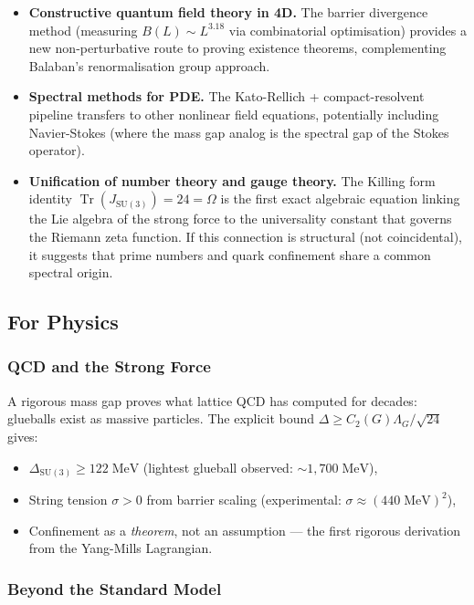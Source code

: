 \documentclass[11pt,a4paper]{article}
\theoremstyle{plain}
\theoremstyle{remark}
\renewcommand{\Omega}{\varOmega}
\newcommand{\Tr}{\operatorname{Tr}}
\newcommand{\SU}{\mathrm{SU}}
\begin{document}
\begin{itemize}[itemsep=3pt]
\item \textbf{Constructive quantum field theory in 4D.}  The barrier
  divergence method (measuring $B(L) \sim L^{3.18}$ via combinatorial
  optimisation) provides a new non-perturbative route to proving
  existence theorems, complementing Balaban's renormalisation group
  approach.

\item \textbf{Spectral methods for PDE.}  The Kato-Rellich +
  compact-resolvent pipeline transfers to other nonlinear field
  equations, potentially including Navier-Stokes (where the mass gap
  analog is the spectral gap of the Stokes operator).

\item \textbf{Unification of number theory and gauge theory.}  The
  Killing form identity $\Tr(J_{\SU(3)}) = 24 = \Omega$ is the first
  exact algebraic equation linking the Lie algebra of the strong force
  to the universality constant that governs the Riemann zeta function.
  If this connection is structural (not coincidental), it suggests that
  prime numbers and quark confinement share a common spectral origin.
\end{itemize}

\subsection{For Physics}

\subsubsection{QCD and the Strong Force}

A rigorous mass gap proves what lattice QCD has computed for decades:
glueballs exist as massive particles.  The explicit bound
$\Delta \geq C_2(G) \Lambda_G / \sqrt{24}$ gives:
\begin{itemize}[itemsep=2pt]
\item $\Delta_{\SU(3)} \geq 122\;\mathrm{MeV}$ (lightest glueball
  observed: $\sim 1{,}700\;\mathrm{MeV}$),
\item String tension $\sigma > 0$ from barrier scaling (experimental:
  $\sigma \approx (440\;\mathrm{MeV})^2$),
\item Confinement as a \emph{theorem}, not an assumption --- the first
  rigorous derivation from the Yang-Mills Lagrangian.
\end{itemize}

\subsubsection{Beyond the Standard Model}
\end{document}
